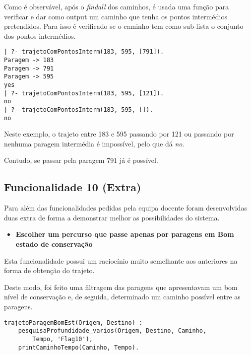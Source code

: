\documentclass[a4paper,12pt]{report}
\begin{document}
\par Como é observável, após o \textit{findall} dos caminhos, é usada uma função para verificar e dar como output um caminho que tenha os pontos intermédios pretendidos.
Para isso é verificado se o caminho tem como sub-lista o conjunto dos pontos intermédios.

\begin{verbatim}
| ?- trajetoComPontosInterm(183, 595, [791]).
Paragem -> 183
Paragem -> 791
Paragem -> 595
yes
| ?- trajetoComPontosInterm(183, 595, [121]).
no
| ?- trajetoComPontosInterm(183, 595, []).
no
\end{verbatim}  

\par Neste exemplo, o trajeto entre 183 e 595 passando por 121 ou passando por nenhuma paragem intermédia é impossível, pelo que dá \textit{no}. 
\par Contudo, se passar pela paragem 791 já é possível.

\vspace{10cm}

\subsection{Funcionalidade 10 (Extra)}
\par Para além das funcionalidades pedidas pela equipa docente foram desenvolvidas duas extra de forma a demonstrar melhor as possibilidades do sistema.

\vspace{1cm}

\begin{itemize}
    \item \textbf{Escolher um percurso que passe apenas por paragens em Bom estado de conservação}
\end{itemize}

\par Esta funcionalidade possui um raciocínio muito semelhante aos anteriores na forma de obtenção do trajeto.
\par Deste modo, foi feito uma filtragem das paragens que apresentavam um bom nível de conservação e, de seguida, determinado um caminho possível entre as paragens.

\begin{verbatim}
trajetoParagemBomEst(Origem, Destino) :-
    pesquisaProfundidade_varios(Origem, Destino, Caminho,
        Tempo, 'Flag10'),
    printCaminhoTempo(Caminho, Tempo).
\end{verbatim}  
\end{document}
